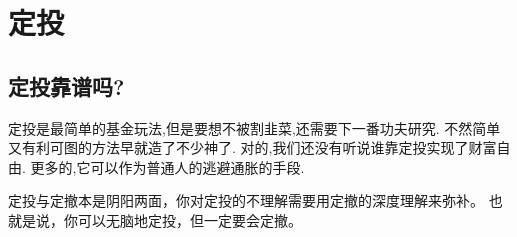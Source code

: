 \chapter{定投}\label{ch:fixed_investment}

\section{定投靠谱吗?}

定投是最简单的基金玩法,但是要想不被割韭菜,还需要下一番功夫研究.
不然简单又有利可图的方法早就造了不少神了.
对的,我们还没有听说谁靠定投实现了财富自由.
更多的,它可以作为普通人的逃避通胀的手段.

定投与定撤本是阴阳两面，你对定投的不理解需要用定撤的深度理解来弥补。
也就是说，你可以无脑地定投，但一定要会定撤。


